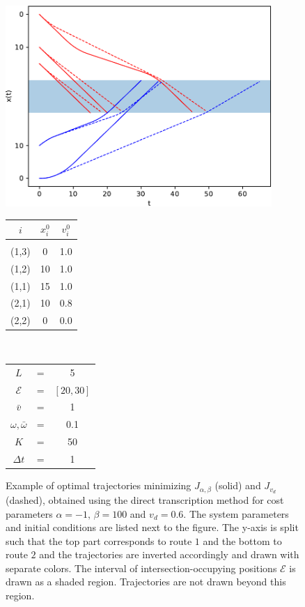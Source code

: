 \documentclass[a4paper]{report}
\theoremstyle{definition}
\theoremstyle{plain}
\begin{document}
\begin{figure}
  \centering
  \begin{minipage}{0.76\textwidth}
  \includegraphics[width=0.9\textwidth]{figures/single/trajectories_general.pdf}%
  \end{minipage}
  \begin{minipage}{0.23\textwidth}
  \vspace*{-1em}
  \begin{tabular}{ c c c }
    $i$ & $x_{i}^{0}$ & $v_{i}^{0}$ \\[0.2em]
    \hline\\[-1em]
    {\color{red}(1,3)} &  0 & 1.0 \\
    {\color{red}(1,2)} & 10 & 1.0 \\
    {\color{red}(1,1)} & 15 & 1.0 \\
    {\color{blue}(2,1)} & 10 & 0.8 \\
    {\color{blue}(2,2)} &  0 & 0.0
  \end{tabular}
  \\[2em]
  \begin{tabular}{ c c c }
    $L$ & = &  5 \\
    $\mathcal{E}$ & = & $[20, 30]$ \\
    $\bar{v}$ & = & 1 \\
    $\omega, \bar{\omega}$ & = & 0.1 \\
    $K$ & = & 50 \\
    $\Delta t$ & = & 1
  \end{tabular}
  \end{minipage}
  \caption{Example of optimal trajectories minimizing $J_{\alpha,\beta}$ (solid)
    and $J_{v_{d}}$ (dashed), obtained using the direct transcription method for
    cost parameters $\alpha = -1, \, \beta = 100$ and $v_{d} = 0.6$. The system
    parameters and initial conditions are listed next to the figure. The y-axis
    is split such that the top part corresponds to route $1$ and the bottom to
    route $2$ and the trajectories are inverted accordingly and drawn with
    separate colors. The interval of intersection-occupying positions
    $\mathcal{E}$ is drawn as a shaded region. Trajectories
    are not drawn beyond this region.}%
  \label{fig:direct_transcription_example}
\end{figure}
\end{document}
